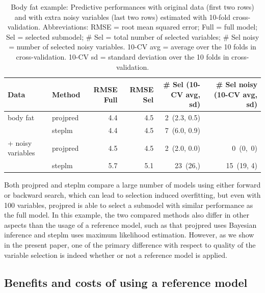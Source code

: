 \documentclass[a4]{article}
\theoremstyle{definition}
\begin{document}
\begin{table}[tp]
\footnotesize
\centering
\begin{tabular}{ll|rrrr}
Data  & Method & RMSE Full & RMSE Sel & \# Sel (10-CV avg, sd) & \# Sel noisy (10-CV avg, sd) \\ 
  \hline
body fat & projpred & 4.4 & 4.5 &  2\, (2.3, 0.5) &   \\
& steplm & 4.4 & 4.5 & 7\, (6.0, 0.9) &  \\
\hline
+ noisy variables & projpred & 4.5 & 4.5 &  2\, (2.0, 0.0)&  0\,\; (0,\, 0)  \\
& steplm & 5.7 & 5.1 & 23\, (26,\; 4.5) &  15\, (19, 4) \\
\end{tabular}
\caption{Body fat example: Predictive performances with original data (first two
  rows) and with extra noisy variables (last two rows) estimated with
  10-fold cross-validation. Abbreviations: RMSE = root mean squared error;
  Full = full model; Sel = selected submodel; 
  \# Sel = total number of selected variables;
  \# Sel noisy = number of selected noisy variables. 
  10-CV avg = average over the 10 folds in cross-validation. 10-CV sd = standard deviation
  over the 10 folds in cross-validation.}
\label{tab:model_performances}
\end{table}

Both projpred and steplm compare a large number of models using either
forward or backward search, which can lead to selection induced
overfitting, but even with 100 variables, projpred is able to select a
submodel with similar performance as the full model. In this example, the two
 compared methods also differ in other aspects than the usage of a reference 
 model, such as that projpred
uses Bayesian inference and steplm uses maximum likelihood estimation. 
However, as we show in the present paper, one of the primary difference 
with respect to quality of the variable selection is indeed whether or 
not a reference model is applied.

\subsection{Benefits and costs of using a reference model}
\end{document}
